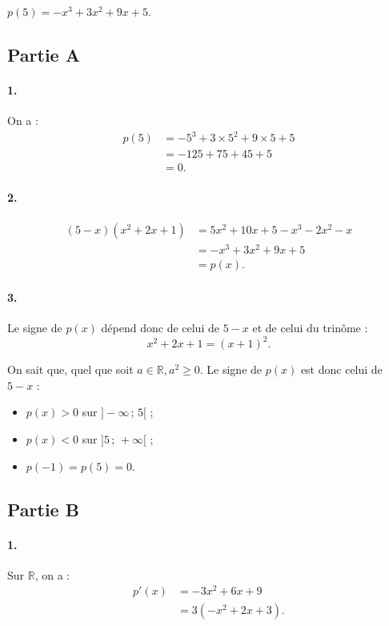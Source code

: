 \( p(5) = -x^3 + 3x^2 + 9x + 5\).

\subsection*{Partie A}

\paragraph{1.} On a :
\begin{align*}
p(5) &= -5^3 + 3 \times 5^2 + 9 \times 5 + 5 \\
&= -125 + 75 + 45 + 5 \\
&= 0.
\end{align*}

\paragraph{2.} 
\begin{align*}
(5 - x)(x^2 + 2x + 1) &= 5x^2 + 10x + 5 - x^3 - 2x^2 - x \\
&= -x^3 + 3x^2 + 9x + 5 \\
&= p(x).
\end{align*}

\paragraph{3.} Le signe de \( p(x) \) dépend donc de celui de \( 5 - x \) et de celui du trinôme :
\[
x^2 + 2x + 1 = (x + 1)^2.
\]

On sait que, quel que soit \(a \in \mathbb{R}, a^2 \geqslant 0\). Le signe de \( p(x) \) est donc celui de \( 5 - x \) :
\begin{itemize}
    \item \( p(x) > 0 \) sur \( ]-\infty \,;\, 5[ \) ;
    \item \( p(x) < 0 \) sur \( ]5 \,;\, +\infty[ \) ;
    \item \( p(-1) = p(5) = 0 \).
\end{itemize}

\subsection*{Partie B}

\paragraph{1.} Sur \( \mathbb{R} \), on a :
\begin{align*}
p'(x) &= -3x^2 + 6x + 9 \\
&= 3(-x^2 + 2x + 3).
\end{align*}

